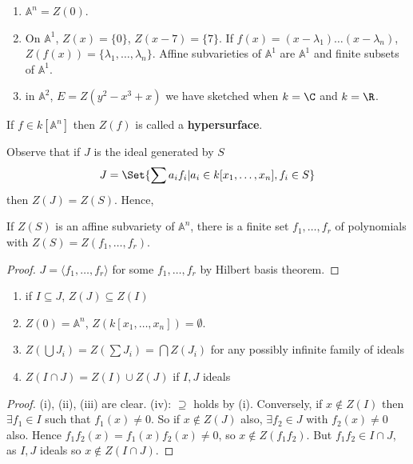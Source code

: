 \documentclass{article}
\newcommand{\A}{\mathbb{A}}
\begin{document}
\begin{eg}
    \leavevmode
    \begin{enumerate}[label=(\roman*)]
        \item $\A^n = Z(0)$.
        \item On $\A^1$, $Z(x) = \{0\}$, $Z(x-7) = \{7\}$.  If $f(x) = (x - \lambda_1)\dotsc (x-\lambda_n)$, $Z(f(x)) = \{\lambda_1, \dotsc, \lambda_n\}$.
            Affine subvarieties of $\A^1$ are $\A^1$ and finite subsets of $\A^1$.
        \item in $\A^2$, $E=Z(y^2-x^3+x)$ we have sketched when $k=\C$ and $k=\R$.
    \end{enumerate}
\end{eg}

\begin{remark}
    If $f \in k[\A^n]$ then $Z(f)$ is called a \textbf{hypersurface}.
\end{remark}

Observe that if $J$ is the ideal generated by $S$
\begin{equation*}
    J = \Set{\sum a_i f_i | a_i \in k[x_1, \dotsc, x_n], f_i \in S}
\end{equation*}
then $Z(J) = Z(S)$.  Hence,
\begin{thm}
    If $Z(S)$ is an affine subvariety of $\A^n$, there is a finite set $f_1, \dotsc, f_r$ of polynomials with $Z(S) = Z(f_1, \dotsc, f_r)$.
\end{thm}

\begin{proof}
    $J = \langle f_1, \dotsc, f_r \rangle$ for some $f_1, \dotsc, f_r$ by Hilbert basis theorem.
\end{proof}

\begin{lemma}
    \leavevmode
    \begin{enumerate}[label=(\roman*)]
        \item if $I \subseteq J$, $Z(J) \subseteq Z(I)$
        \item $Z(0) = \A^n$, $Z(k[x_1, \dotsc, x_n]) = \emptyset$.
        \item $Z\left(\bigcup J_i\right) = Z(\sum J_i) = \bigcap Z(J_i)$ for any possibly infinite family of ideals
        \item $Z(I \cap J) = Z(I) \cup Z(J)$ if $I, J$ ideals
    \end{enumerate}
\end{lemma}
\begin{proof}
    (i), (ii), (iii) are clear.
    (iv): $\supseteq$ holds by (i). Conversely, if $x \notin Z(I)$ then $\exists f_1 \in I$ such that $f_1(x) \neq 0$.
    So if $x \notin Z(J)$ also, $\exists f_2 \in J$ with $f_2(x) \neq 0$ also.
    Hence $f_1 f_2(x) = f_1(x) f_2(x) \neq 0$, so $x \notin Z(f_1 f_2)$. But $f_1 f_2 \in I \cap J$, as $I, J$ ideals so $x \notin Z(I \cap J)$.
\end{proof}
\end{document}
